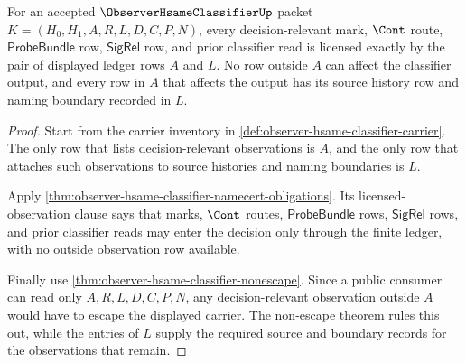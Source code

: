 \begin{theorem}
\label{thm:observer-hsame-classifier-licensed-observation-exactness}
For an accepted $\ObserverHsameClassifierUp$ packet $K=(H_0,H_1,A,R,L,D,C,P,N)$, every decision-relevant mark, $\Cont$ route, $\mathsf{ProbeBundle}$ row, $\mathsf{SigRel}$ row, and prior classifier read is licensed exactly by the pair of displayed ledger rows $A$ and $L$. No row outside $A$ can affect the classifier output, and every row in $A$ that affects the output has its source history row and naming boundary recorded in $L$.
\end{theorem}
\begin{proof}
Start from the carrier inventory in \autoref{def:observer-hsame-classifier-carrier}. The only row that lists decision-relevant observations is $A$, and the only row that attaches such observations to source histories and naming boundaries is $L$.

Apply \autoref{thm:observer-hsame-classifier-namecert-obligations}. Its licensed-observation clause says that marks, $\Cont$ routes, $\mathsf{ProbeBundle}$ rows, $\mathsf{SigRel}$ rows, and prior classifier reads may enter the decision only through the finite ledger, with no outside observation row available.

Finally use \autoref{thm:observer-hsame-classifier-nonescape}. Since a public consumer can read only $A,R,L,D,C,P,N$, any decision-relevant observation outside $A$ would have to escape the displayed carrier. The non-escape theorem rules this out, while the entries of $L$ supply the required source and boundary records for the observations that remain.
\end{proof}

